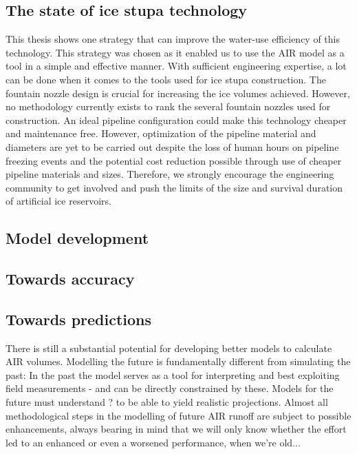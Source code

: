 \subsection{The state of ice stupa technology}

This thesis shows one strategy that can improve the water-use efficiency of this technology. This strategy was
chosen as it enabled us to use the AIR model as a tool in a simple and effective manner. With sufficient
engineering expertise, a lot can be done when it comes to the tools used for ice stupa construction. The
fountain nozzle design is crucial for increasing the ice volumes achieved. However, no methodology currently
exists to rank the several fountain nozzles used for construction. An ideal pipeline configuration could make
this technology cheaper and maintenance free. However, optimization of the pipeline material and diameters are
yet to be carried out despite the loss of human hours on pipeline freezing events and the potential cost
reduction possible through use of cheaper pipeline materials and sizes. Therefore, we strongly encourage the
engineering community to get involved and push the limits of the size and survival duration of artificial ice
reservoirs. 

\subsection{Model development}

\subsection{Towards accuracy}


\subsection{Towards predictions}

There is still a substantial potential for developing better models to calculate AIR volumes. Modelling the
future is fundamentally different from simulating the past: In the past the model serves as a tool for
interpreting and best exploiting field measurements - and can be directly constrained by these. Models for the
future must understand ? to be able to yield realistic projections. Almost all methodological steps in the
modelling of future AIR runoff are subject to possible enhancements, always bearing in mind that we will only
know whether the effort led to an enhanced or even a worsened performance, when we're old... 

